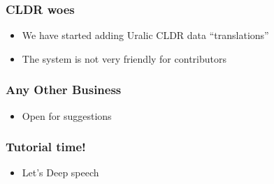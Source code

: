 \documentclass{beamer}
\begin{document}
\begin{frame}
    \frametitle{CLDR woes}
    \begin{itemize}
        \item We have started adding Uralic CLDR data ``translations''
        \item The system is not very friendly for contributors
    \end{itemize}
\end{frame}

\begin{frame}
    \frametitle{Any Other Business}
    \begin{itemize}
        \item Open for suggestions
    \end{itemize}
\end{frame}

\begin{frame}
    \frametitle{Tutorial time!}
    \begin{itemize}
        \item Let's Deep speech
    \end{itemize}
\end{frame}
\end{document}
